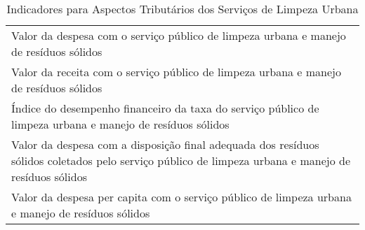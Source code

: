 \begin{table}[htbp]
  \centering
  \caption{ Indicadores para Aspectos Tributários dos Serviços de Limpeza Urbana}
    \begin{tabular}{|p{25em}|}
    \rowcolor[rgb]{ .776,  .878,  .706} \multicolumn{1}{P{25em}}{INDICADORES DOS ASPECTOS TRIBUTÁRIOS DOS SERVIÇOS DE LIMPEZA URBANA} \\
    \midrule
    Valor da despesa com o serviço público de limpeza urbana e manejo de resíduos sólidos \\
    \midrule
    Valor da receita com o serviço público de limpeza urbana e manejo de resíduos sólidos \\
    \midrule
    Índice do desempenho financeiro da taxa do serviço público de limpeza urbana e manejo de resíduos sólidos \\
    \midrule
    Valor da despesa com a disposição final adequada dos resíduos sólidos coletados pelo serviço público de limpeza urbana e manejo de resíduos sólidos \\
    \midrule
    Valor da despesa per capita com o serviço público de limpeza urbana e manejo de  resíduos sólidos \\
    \bottomrule
    \end{tabular}%
  \label{tab:ind_tributo_slu}%
\end{table}%
